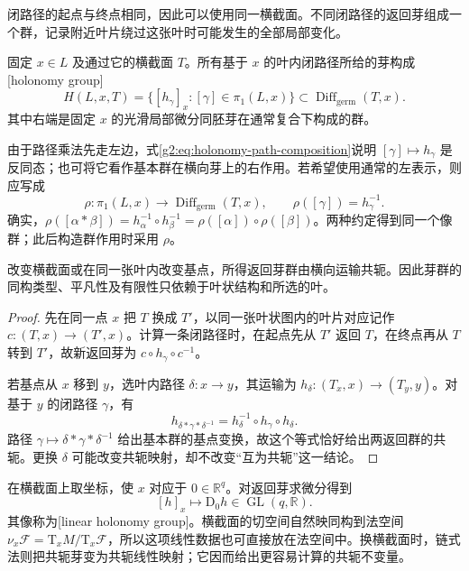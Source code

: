 闭路径的起点与终点相同，因此可以使用同一横截面。不同闭路径的返回芽组成一个群，记录附近叶片绕过这张叶时可能发生的全部局部变化。

\begin{definition}\label{g2:def:leaf-holonomy-group}
	固定 \(x\in L\) 及通过它的横截面 \(T\)。所有基于 \(x\) 的叶内闭路径所给的芽构成[holonomy group]
	\[
		H(L,x,T)=\{[h_\gamma]_x:[\gamma]\in\pi_1(L,x)\}
		\subset\operatorname{Diff}_{\mathrm{germ}}(T,x).
	\]
	其中右端是固定 \(x\) 的光滑局部微分同胚芽在通常复合下构成的群。
\end{definition}

由于路径乘法先走左边，式\eqref{g2:eq:holonomy-path-composition}说明 \([\gamma]\mapsto h_\gamma\) 是反同态；也可将它看作基本群在横向芽上的右作用。若希望使用通常的左表示，则应写成
\begin{equation}\label{g2:eq:holonomy-left-representation}
	\rho:\pi_1(L,x)\longrightarrow\operatorname{Diff}_{\mathrm{germ}}(T,x),
	\qquad\rho([\gamma])=h_\gamma^{-1}.
\end{equation}
确实，\(\rho([\alpha*\beta])=h_\alpha^{-1}\circ h_\beta^{-1}=\rho([\alpha])\circ\rho([\beta])\)。两种约定得到同一个像群；此后构造群作用时采用 \(\rho\)。

\begin{proposition}\label{g2:prop:holonomy-conjugacy}
	改变横截面或在同一张叶内改变基点，所得返回芽群由横向运输共轭。因此芽群的同构类型、平凡性及有限性只依赖于叶状结构和所选的叶。
\end{proposition}
\begin{proof}
	先在同一点 \(x\) 把 \(T\) 换成 \(T'\)，以同一张叶状图内的叶片对应记作 \(c:(T,x)\to(T',x)\)。计算一条闭路径时，在起点先从 \(T'\) 返回 \(T\)，在终点再从 \(T\) 转到 \(T'\)，故新返回芽为 \(c\circ h_\gamma\circ c^{-1}\)。

	若基点从 \(x\) 移到 \(y\)，选叶内路径 \(\delta:x\to y\)，其运输为 \(h_\delta:(T_x,x)\to(T_y,y)\)。对基于 \(y\) 的闭路径 \(\gamma\)，有
	\[
		h_{\delta*\gamma*\delta^{-1}}
		=h_\delta^{-1}\circ h_\gamma\circ h_\delta.
	\]
	路径 \(\gamma\mapsto\delta*\gamma*\delta^{-1}\) 给出基本群的基点变换，故这个等式恰好给出两返回群的共轭。更换 \(\delta\) 可能改变共轭映射，却不改变“互为共轭”这一结论。
\end{proof}

在横截面上取坐标，使 \(x\) 对应于 \(0\in\mathbb R^q\)。对返回芽求微分得到
\[
	[h]_x\longmapsto\mathrm D_0h\in\operatorname{GL}(q,\mathbb R).
\]
其像称为[linear holonomy group]。横截面的切空间自然映同构到法空间 \(\nu_x\mathcal F=\mathrm T_xM/\mathrm T_x\mathcal F\)，所以这项线性数据也可直接放在法空间中。换横截面时，链式法则把共轭芽变为共轭线性映射；它因而给出更容易计算的共轭不变量。

